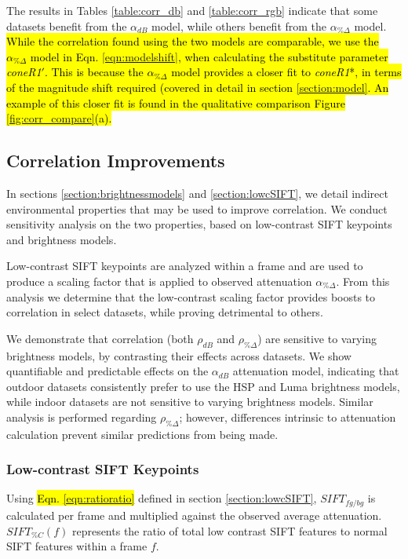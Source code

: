 \documentclass[12pt]{report}
\begin{document}
The results in Tables \ref{table:corr_db} and \ref{table:corr_rgb} indicate that some datasets benefit from the $\alpha_{dB}$ model, while others benefit from the $\alpha_{\%\Delta}$ model. \hl{While the correlation found using the two models are comparable, we use the $\alpha_{\%\Delta}$ model in Eqn. \ref{eqn:modelshift}, when calculating the substitute parameter \textit{coneR1}$'$. This is because the $\alpha_{\%\Delta}$ model provides a closer fit to \textit{coneR1}*, in terms of the magnitude shift required (covered in detail in section \ref{section:model}. An example of this closer fit is found in the qualitative comparison Figure \ref{fig:corr_compare}(a).}

\subsection{Correlation Improvements}

In sections \ref{section:brightnessmodels} and \ref{section:lowcSIFT}, we detail indirect environmental properties that may be used to improve correlation. We conduct sensitivity analysis on the two properties, based on low-contrast SIFT keypoints and brightness models. 

Low-contrast SIFT keypoints are analyzed within a frame and are used to produce a scaling factor that is applied to observed attenuation $\alpha_{\%\Delta}$. From this analysis we determine that the low-contrast scaling factor provides boosts to correlation in select datasets, while proving detrimental to others.

We demonstrate that correlation (both $\rho_{dB}$ and $\rho_{\%\Delta}$) are sensitive to varying brightness models, by contrasting their effects across datasets. We show quantifiable and predictable effects on the $\alpha_{dB}$ attenuation model, indicating that outdoor datasets consistently prefer to use the HSP and Luma brightness models, while indoor datasets are not sensitive to varying brightness models. Similar analysis is performed regarding $\rho_{\%\Delta}$; however, differences intrinsic to attenuation calculation prevent similar predictions from being made.

\subsubsection{Low-contrast SIFT Keypoints} \label{section:lowcsensitivity}

Using \hl{Eqn. \ref{eqn:ratioratio}} defined in section \ref{section:lowcSIFT}, $SIFT_{fg/bg}$ is calculated per frame and multiplied against the observed average attenuation. $SIFT_{\%C}(f)$ represents the ratio of total low contrast SIFT features to normal SIFT features within a frame $f$.
\end{document}
